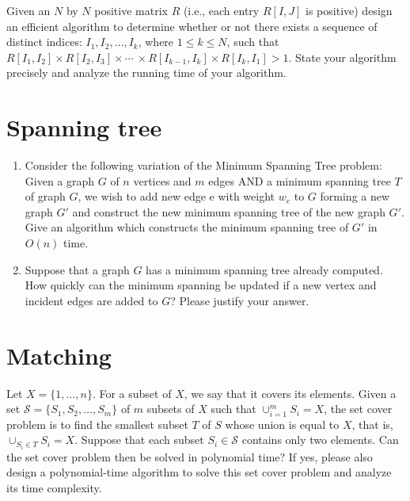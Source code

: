 \begin{refsection}
\begin{Exercise}
Given an $N$ by $N$ positive matrix $R$ (i.e., each entry $R[I, J]$ is positive) design an efficient algorithm to determine whether or not there exists a sequence of distinct indices: $I_1, I_2, \dots, I_k$, where $1 \leq k \leq N$, such that $ R[I_1, I_2] \times R[I_2, I_3] \times \cdots \ \times R[I_{k-1}, I_k] \times R[I_k, I_1] > 1$. State your algorithm precisely and analyze the running time of your algorithm. 
\end{Exercise}
\begin{Answer}
\end{Answer}

\section{Spanning tree}
\begin{Exercise}
\begin{enumerate}
\item Consider the following variation of the Minimum Spanning Tree problem: Given a graph $G$ of $n$ vertices and $m$ edges AND a minimum spanning tree $T$ of graph $G$, we wish to add new edge e with weight $w_e$ to $G$ forming a new graph $G'$ and construct the new minimum spanning tree of the new graph $G'$. Give an algorithm which constructs the minimum spanning tree of $G'$ in $O(n)$ time. 
\item Suppose that a graph $G$ has a minimum spanning tree already computed. How quickly can the minimum spanning be updated if a new vertex and incident edges are added to $G$? Please justify your answer.
\end{enumerate}
\end{Exercise}
\begin{Answer}
\end{Answer}

\section{Matching}
\begin{Exercise}
Let $X = \{1, \dots, n\}$. For a subset of $X$, we say that it covers its elements. Given a set $\mathcal{S} = \{ S_1, S_2, \dots, S_m\}$ of $m$ subsets of $X$ such that $\cup_{i=1}^m S_i = X$, the set cover problem is to find the smallest subset $T$ of $S$ whose union is equal to $X$, that is, $\cup_{S_i \in T} S_i = X$. Suppose that each subset $S_i \in \mathcal{S}$ contains only two elements. Can the set cover problem then be solved in polynomial time? If yes, please also design a polynomial-time algorithm to solve this set cover problem and analyze its time complexity. 
\end{Exercise}
\begin{Answer}
\end{Answer}


\end{refsection}
